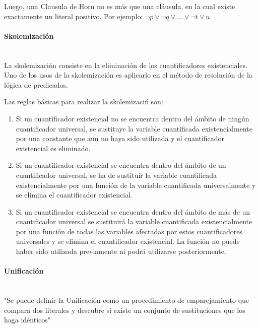 \documentclass{article}
\begin{document}
Luego, una Clausula de Horn no es m\'as que una cl\'ausula, en la cual existe exactamente un literal positivo. Por ejemplo: $ \neg p \lor \neg q \lor ... \lor \neg t \lor u$ 

\paragraph{Skolemizaci\'on}\mbox{}\\

La skolemizaci\'on consiste en la eliminaci\'on de los cuantificadores existenciales.
Uno de los usos de la skolemizaci\'on es aplicarlo en el m\'etodo de resoluci\'on de la l\'ogica de predicados.

 Las reglas básicas para realizar la skolemizaci\'n son:
\begin{enumerate}

\item Si un cuantificador existencial no se encuentra dentro del \'ambito de ning\'un cuantificador universal, se sustituye la variable cuantificada existencialmente por una constante que aun no haya sido utilizada y el cuantificador existencial es eliminado.

\item Si un cuantificador existencial se encuentra dentro del \'ambito de un cuantificador universal, se ha de sustituir la variable cuantificada existencialmente por una funci\'on de la variable cuantificada universalmente y se elimina el cuantificador existencial.
	
\item Si un cuantificador existencial se encuentra dentro del \'ambito de más de un cuantificador universal se sustituir\'a la variable cuantificada existencialmente por una funci\'on de todas las variables afectadas por estos cuantificadores universales y se elimina el cuantificador existencial. La funci\'on no puede haber sido utilizada previamente ni podr\'a utilizarse posteriormente.

\end{enumerate}

\paragraph{Unificaci\'on}\mbox{}\\

"Se puede definir la Unificación como un procedimiento de emparejamiento que compara dos literales y descubre si existe un conjunto de sustituciones que los haga id\'enticos"
\end{document}
